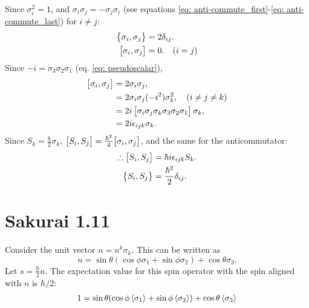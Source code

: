 \documentclass[
a4paper,
10pt,
twoside,
]{article}
\begin{document}
Since $\sigma_i^2 = 1$, and $\sigma_i\sigma_j = -\sigma_j\sigma_i$ (see equations \ref{eq: anti-commute_first}-\ref{eq: anti-commute_last}) for $i\neq j$:
\begin{align}
	\anticommutator{\sigma_i}{\sigma_j} &= 2\delta_{ij}.\\
	\commutator{\sigma_i}{\sigma_j} &= 0.\quad(i=j)\\
\end{align}
Since $-i=\sigma_3\sigma_2\sigma_1$ (eq. \ref{eq: pseudoscalar}),
\begin{align}
	\commutator{\sigma_i}{\sigma_j} &= 2\sigma_i\sigma_j,\\
	&= 2\sigma_i\sigma_j(-i^2)\sigma_k^2,\quad(i\neq j \neq k)\\
	&= 2i \left[\sigma_i\sigma_j\sigma_k \sigma_3\sigma_2\sigma_1\right] \sigma_k,\\
	&= 2i \epsilon_{ijk} \sigma_k. 
\end{align}
Since $S_k = \frac{\hbar}{2}\sigma_k$, $\commutator{S_i}{S_j} = \frac{\hbar^2}{4}\commutator{\sigma_i}{\sigma_j}$, and the same for the anticommutator:
\begin{align}
	\therefore \commutator{S_i}{S_j} &= \hbar i \epsilon_{ijk} S_k.\\
	\anticommutator{S_i}{S_j} &= \frac{\hbar^2}{2} \delta_{ij}.
\end{align}

\section{Sakurai 1.11}
Consider the unit vector $n = n^k \sigma_k$.
This can be written as
\begin{equation}
	n = \sin\theta(\cos\phi \sigma_1 + \sin\phi \sigma_2) + \cos\theta \sigma_3.
\end{equation}
Let $s = \frac{\hbar}{2}n$.
The expectation value for this spin operator with the spin aligned with $n$ is $\hbar/2$:
\begin{align}
	1 = \sin\theta(\cos\phi \ev{\sigma_1} + \sin\phi \ev{\sigma_2}) + \cos\theta \ev{\sigma_3}
\end{align}
\end{document}
